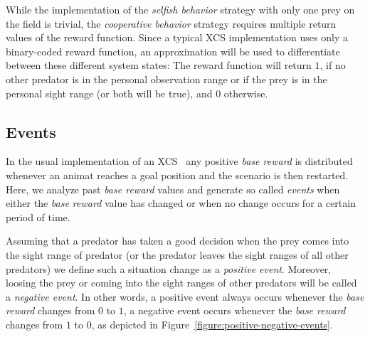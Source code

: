 While the implementation of the \emph{selfish behavior} strategy with only one prey on the field is trivial, the \emph{cooperative behavior} strategy requires multiple return values of the reward function. Since a typical XCS implementation \cite{BW02} uses only a binary-coded reward function, an approximation will be used to differentiate between these different system states: The reward function will return $1$, if no other predator is in the personal observation range or if the prey is in the personal sight range (or both will be true), and $0$ otherwise. 



\subsection{Events}
\label{subsection:events}

In the usual implementation of an XCS~\cite{BW02} any positive \emph{base reward} is distributed whenever an animat reaches a goal position and the scenario is then restarted. Here, we analyze past \emph{base reward} values and generate so called \emph{events} when either the \emph{base reward} value has changed or when no change occurs for a certain period of time.

Assuming that a predator has taken a good decision when the prey comes into the sight range of predator (or the predator leaves the sight ranges of all other predators) we define such a situation change as a \emph{positive event}. Moreover, loosing the prey or coming into the sight ranges of other predators will be called a \emph{negative event}. In other words, a positive event always occurs whenever the \emph{base reward} changes from $0$ to $1$, a negative event occurs whenever the \emph{base reward} changes from $1$ to $0$, as depicted in Figure~\ref{figure:positive-negative-events}.

